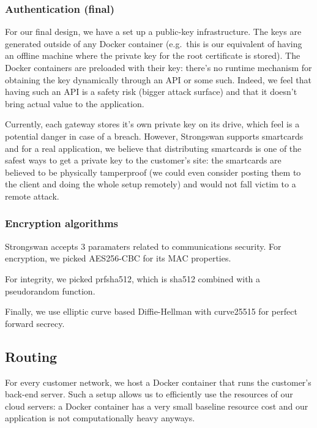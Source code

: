 \documentclass[paper=a4, fontsize=11pt]{scrartcl}
\begin{document}
\subsubsection{Authentication (final)}

For our final design, we have a set up a public-key infrastructure.
The keys are generated outside of any Docker container (e.g.\ this is our
equivalent of having an offline machine where the private key for the root
certificate is stored).
The Docker containers are preloaded with their key: there's no runtime
mechanism for obtaining the key dynamically through an API or some such.
Indeed, we feel that having such an API is a safety risk (bigger attack surface)
and that it doesn't bring actual value to the application.

Currently, each gateway stores it's own private key on its drive, which feel is
a potential danger in case of a breach.
However, Strongswan supports smartcards and for a real application, we believe
that distributing smartcards is one of the safest ways to get a private key to
the customer's site: the smartcards are believed to be physically tamperproof
(we could even consider posting them to the client and doing the whole setup
remotely) and would not fall victim to a remote attack.

\subsubsection{Encryption algorithms}

Strongswan accepts 3 paramaters related to communications security.
For encryption, we picked AES256-CBC for its MAC properties\@.

For integrity, we picked prfsha512, which is sha512 combined with a pseudorandom
function.

Finally, we use elliptic curve based Diffie-Hellman with curve25515 for perfect
forward secrecy.

\subsection{Routing}

For every customer network, we host a Docker container that runs the customer's
back-end server.
Such a setup allows us to efficiently use the resources of our cloud servers: a
Docker container has a very small baseline resource cost and our application is
not computationally heavy anyways.
\end{document}
